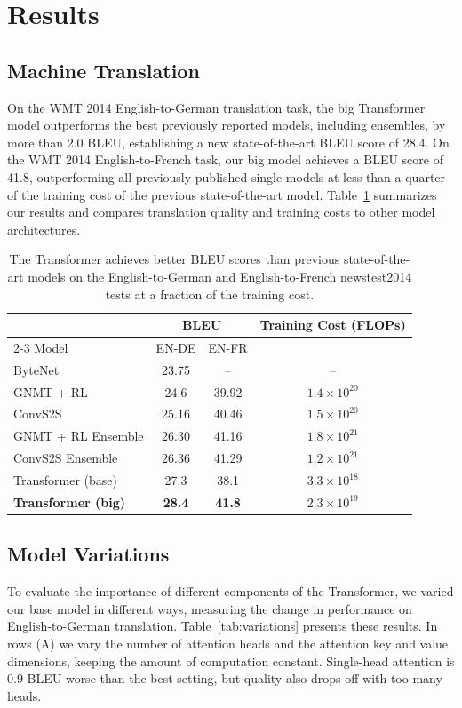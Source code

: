 \documentclass[conference]{IEEEtran}
\begin{document}
\section{Results}
\subsection{Machine Translation}
On the WMT 2014 English-to-German translation task, the big Transformer model
outperforms the best previously reported models, including ensembles, by more than
2.0 BLEU, establishing a new state-of-the-art BLEU score of 28.4. On the WMT 2014
English-to-French task, our big model achieves a BLEU score of 41.8, outperforming
all previously published single models at less than a quarter of the training cost
of the previous state-of-the-art model. Table~\ref{tab:bleu} summarizes our
results and compares translation quality and training costs to other model
architectures.

\begin{table}[t]
\centering
\caption{The Transformer achieves better BLEU scores than previous
state-of-the-art models on the English-to-German and English-to-French
newstest2014 tests at a fraction of the training cost.}
\label{tab:bleu}
\begin{tabular}{@{}lccc@{}}
\toprule
 & \multicolumn{2}{c}{BLEU} & Training Cost (FLOPs) \\
\cmidrule(lr){2-3}
Model & EN-DE & EN-FR & \\
\midrule
ByteNet                 & 23.75 & --    & --                  \\
GNMT + RL               & 24.6  & 39.92 & $1.4 \times 10^{20}$ \\
ConvS2S                 & 25.16 & 40.46 & $1.5 \times 10^{20}$ \\
GNMT + RL Ensemble      & 26.30 & 41.16 & $1.8 \times 10^{21}$ \\
ConvS2S Ensemble        & 26.36 & 41.29 & $1.2 \times 10^{21}$ \\
\midrule
Transformer (base)      & 27.3  & 38.1  & $3.3 \times 10^{18}$ \\
\textbf{Transformer (big)} & \textbf{28.4} & \textbf{41.8} & $2.3 \times 10^{19}$ \\
\bottomrule
\end{tabular}
\end{table}

\subsection{Model Variations}
To evaluate the importance of different components of the Transformer, we varied
our base model in different ways, measuring the change in performance on
English-to-German translation. Table~\ref{tab:variations} presents these results.
In rows (A) we vary the number of attention heads and the attention key and value
dimensions, keeping the amount of computation constant. Single-head attention is
0.9 BLEU worse than the best setting, but quality also drops off with too many
heads.
\end{document}

